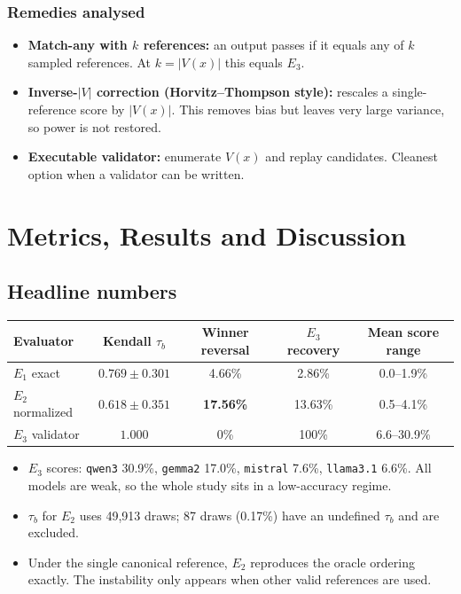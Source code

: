 \documentclass[11pt,a4paper]{article}
\newcommand{\E}[1]{E_{#1}}
\begin{document}
\subsubsection{Remedies analysed}
\begin{itemize}
\item \textbf{Match-any with $k$ references:} an output passes if it equals any of $k$ sampled references. At $k=|V(x)|$ this equals $\E3$.
\item \textbf{Inverse-$|V|$ correction (Horvitz--Thompson style):} rescales a single-reference score by $|V(x)|$. This removes bias but leaves very large variance, so power is not restored.
\item \textbf{Executable validator:} enumerate $V(x)$ and replay candidates. Cleanest option when a validator can be written.
\end{itemize}

\section{Metrics, Results and Discussion}
\subsection{Headline numbers}
\begin{center}\small
\begin{tabular}{@{}lcccc@{}}
\toprule
Evaluator & Kendall $\tau_b$ & Winner reversal & $\E3$ recovery & Mean score range\\
\midrule
$\E1$ exact & $0.769\pm0.301$ & 4.66\% & 2.86\% & 0.0--1.9\%\\
$\E2$ normalized & $0.618\pm0.351$ & \textbf{17.56\%} & 13.63\% & 0.5--4.1\%\\
$\E3$ validator & $1.000$ & 0\% & 100\% & 6.6--30.9\%\\
\bottomrule
\end{tabular}
\end{center}
\begin{itemize}
\item $\E3$ scores: \texttt{qwen3} 30.9\%, \texttt{gemma2} 17.0\%, \texttt{mistral} 7.6\%, \texttt{llama3.1} 6.6\%. All models are weak, so the whole study sits in a low-accuracy regime.
\item $\tau_b$ for $\E2$ uses 49,913 draws; 87 draws (0.17\%) have an undefined $\tau_b$ and are excluded.
\item Under the single canonical reference, $\E2$ reproduces the oracle ordering exactly. The instability only appears when other valid references are used.
\end{itemize}
\end{document}
